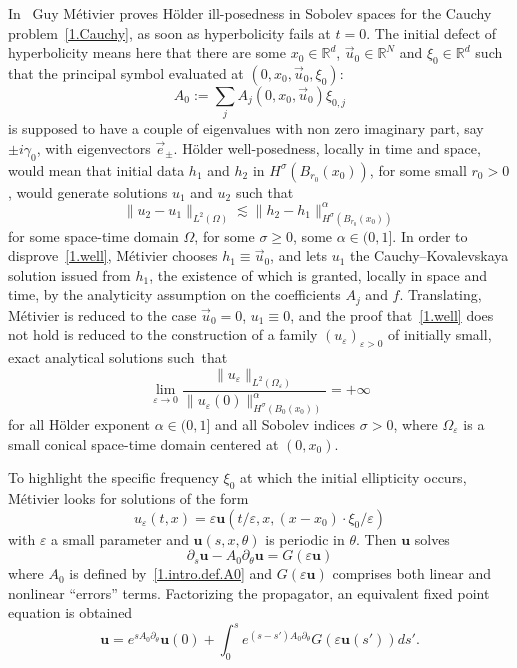 \documentclass[10pt]{amsart}
\theoremstyle{definition}
\theoremstyle{plain}
\newcommand*\e{\varepsilon}
\newcommand*\R{{\mathbb R}}
\newcommand{\dptl}{\partial}%
\newcommand{\alf}{\alpha}%
\newcommand*\g{\gamma}
\newcommand{\ubf}{{\mathbf u}}
\begin{document}
In~\cite[Section~3]{metivier2005remarks} Guy Métivier proves H\"older ill-posedness in Sobolev spaces for the Cauchy problem~\eqref{1.Cauchy}, as soon as hyperbolicity fails at $t=0$. The initial defect of hyperbolicity means here that there are some $x_0\in\R^d$, $\vec{u}_0\in\R^N$ and $\xi_0\in\R^{d}$ such that the principal symbol evaluated at $(0,x_0,\vec{u}_0,\xi_0)$:
\begin{equation}\label{1.intro.def.A0}
A_0 := \sum_j A_j(0,x_0,\vec{u}_0)\xi_{0,j}
\end{equation}
is supposed to have a couple of eigenvalues with non zero imaginary part, say $\pm i \g_0$, with eigenvectors $\vec{e}_{\pm}$. H\"older well-posedness, locally in time and space, would mean that initial data $h_1$ and $h_2$ in $H^{\sigma}(B_{r_0}(x_0))$, for some small $r_0>0$, would generate solutions $u_1$ and $u_2$ such that
\begin{equation}\label{1.well}
\|u_2 - u_1\|_{L^2(\Omega)} \lesssim \| h_2 - h_1 \|_{H^{\sigma}\left(B_{r_0}(x_0)\right)}^{\alf}
\end{equation}
for some space-time domain $\Omega$, for some $\sigma\geq 0$, some $\alf\in(0,1]$. In order to disprove~\eqref{1.well}, Métivier chooses $h_1 \equiv \vec{u}_0$, and lets $u_1$ the Cauchy--Kovalevskaya solution issued from $h_1$, the existence of which is granted, locally in space and time, by the analyticity assumption on the coefficients $A_j$ and $f$. Translating, Métivier is reduced to the case $\vec{u}_0=0$, $u_1 \equiv 0$, and the proof that~\eqref{1.well} does not hold is reduced to the construction of a family $(u_{\e})_{\e >0}$ of initially small, exact analytical solutions such~that
\begin{equation}\label{1.intro.holder}
\lim_{\e\to0} \frac{\|u_{\e}\|_{L^2(\Omega_{\e})}}{\|u_{\e}(0)\|^{\alf}_{H^{\sigma}(B_0(x_0))}} = +\infty
\end{equation}
for all H\"older exponent $\alf \in (0,1]$ and all Sobolev indices $\sigma >0$, where $\Omega_{\e}$ is a small conical space-time domain centered at $(0,x_0)$.

To highlight the specific frequency $\xi_0$ at which the initial ellipticity occurs, Métivier looks for solutions of the form
\begin{equation}\label{1.intro.ansatz}
u_{\e}(t,x) = \e \ubf(t/\e, x, (x-x_0)\cdot\xi_0/\e)
\end{equation}
with $\e$ a small parameter and $\ubf(s,x,\theta)$ is periodic in $\theta$. Then $\ubf$ solves
\begin{equation}\label{1.intro.equation}
\dptl_{s}\ubf - A_0\dptl_{\theta}\ubf = G(\e \ubf)
\end{equation}
where $A_0$ is defined by~\eqref{1.intro.def.A0} and $G(\e \ubf)$ comprises both linear and nonlinear ``errors'' terms. Factorizing the propagator, an equivalent fixed point equation is obtained
\begin{equation}\label{1.intro.pointfixe}
\ubf = e^{sA_0\dptl_{\theta}}\ubf(0) + \int_{0}^{s} e^{(s-s')A_0\dptl_{\theta}}G(\e \ubf(s'))ds'.
\end{equation}
\end{document}
